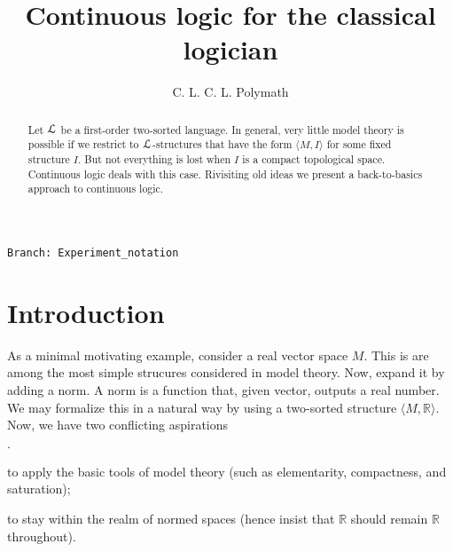 \documentclass[10pt,oneside]{amsproc}
\author{C. L. C. L. Polymath}
\newcommand{\mylabel}[1]{{#1}\hfill}
\renewenvironment{itemize}
  {\begin{list}{$\cdot$}{%
  \setlength{\parskip}{0mm}
  \setlength{\topsep}{.4\baselineskip}
  \setlength{\rightmargin}{0mm}
  \setlength{\listparindent}{0mm}
  \setlength{\itemindent}{0mm}
  \setlength{\labelwidth}{3ex}
  \setlength{\itemsep}{.2\baselineskip}
  \setlength{\parsep}{.2\baselineskip}
  \setlength{\partopsep}{0mm}
  \setlength{\labelsep}{1ex}
  \setlength{\leftmargin}{\labelwidth+\labelsep}
  \let\makelabel\mylabel}}{%
\end{list}}
\begin{document}
\title{Continuous logic for the classical logician}
\hfill\texttt{Branch:\ Experiment\_notation\ \DTMnow}\bigskip
\maketitle
\raggedbottom



\def\forallH{\forall}
\def\existsH{\exists}
\def\forallI{\forall}
\def\existsI{\exists}

\newcommand\questionsign[1][2ex]{%
  \renewcommand\stacktype{L}%
  \scaleto{\stackon[-.6pt]{\color{red}$\triangle$}{\color{red}\bfseries\small ?}}{#1}%
}

\newcommand\dangersign[1][2ex]{%
  \renewcommand\stacktype{L}%
  \scaleto{\stackon[-.6pt]{\color{red}$\triangle$}{\color{red}\bfseries\small !}}{#1}%
}

\begin{abstract}
  Let ${\EuScript L}$ be a first-order two-sorted language.
  In general, very little model theory is possible if we restrict to ${\EuScript L}$-structures that have the form $\langle M,I\rangle$ for some fixed structure $I$.
  But not everything is lost when $I$ is a compact topological space.
  Continuous logic deals with this case.
  Rivisiting old ideas we present a back-to-basics approach to continuous logic.
\end{abstract}
\section{Introduction}\label{intro}


\def\ceq#1#2#3{\parbox[t]{23ex}{$\displaystyle #1$}\parbox{6ex}{\hfil $#2$}{$\displaystyle #3$}}

As a minimal motivating example, consider a real vector space $M$.
This is are among the most simple strucures considered in model theory.
Now, expand it by adding a norm.
A norm is a function that, given vector, outputs a real number.
We may formalize this in a natural way by using a two-sorted structure $\langle M,\mathds{R}\rangle$.
Now, we have two conflicting aspirations
\begin{itemize}
  \item[i.] to apply the basic tools of model theory (such as elementarity, compactness, and saturation);
  \item[ii.] to stay within the realm of normed spaces (hence insist that 
  $\mathds{R}$ should remain $\mathds{R}$ throughout).
\end{itemize}
\end{document}
